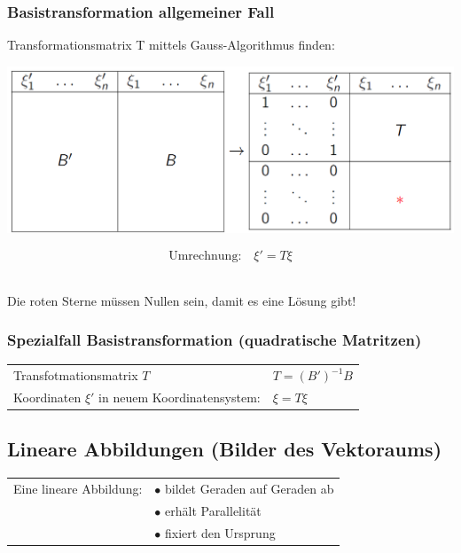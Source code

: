 			\subsubsection{Basistransformation allgemeiner Fall}
			Transformationsmatrix T mittels Gauss-Algorithmus finden: \\
			\begin{minipage}{0.6\linewidth}
			\includegraphics[width=\linewidth]{Bilder/transformationsmatrix} \\
			\end{minipage}
			\hfill
			\begin{minipage}{0.38\linewidth}
			$$ \text{Umrechnung:} \quad \xi' = T \xi$$
			\\
			\end{minipage}

			Die roten Sterne müssen Nullen sein, damit es eine Lösung gibt! 
			

			\subsubsection{Spezialfall Basistransformation (quadratische Matritzen)}		  
			\begin{tabular}{ll}
			Transfotmationsmatrix $T$ &  $T = (B')^{-1} B $	\\
			Koordinaten $\xi'$ in neuem Koordinatensystem: & $\xi = T \xi$ \\
			\end{tabular}				
				  	
		  	
		  	\subsection{Lineare Abbildungen (Bilder des Vektoraums)}
		  	\begin{tabular}{ll}
		  	Eine lineare Abbildung: & $\bullet$ bildet Geraden auf Geraden ab \\
		  	& $\bullet$ erhält Parallelität \\
		  	& $\bullet$ fixiert den Ursprung
		  	\end{tabular}
			
